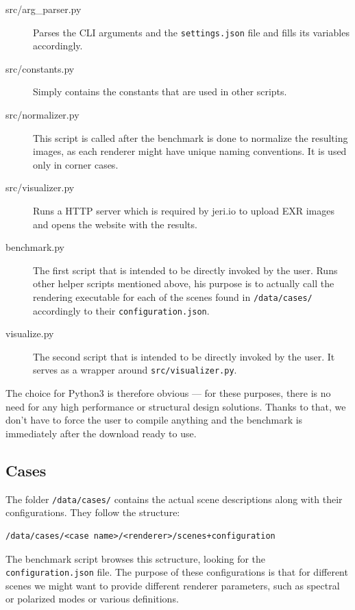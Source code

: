 \begin{description}
	\item[src/arg\_parser.py] Parses the CLI arguments and the \texttt{settings.json} file and fills its variables accordingly.
	\item[src/constants.py] Simply contains the constants that are used in other scripts.
	\item[src/normalizer.py] This script is called after the benchmark is done to normalize the resulting images, as each renderer might have unique naming conventions. It is used only in corner cases.
	\item[src/visualizer.py] Runs a HTTP server which is required by jeri.io to upload EXR images and opens the website with the results.
	\item[benchmark.py] The first script that is intended to be directly invoked by the user. Runs other helper scripts mentioned above, his purpose is to actually call the rendering executable for each of the scenes found in \texttt{/data/cases/} accordingly to their \texttt{configuration.json}.
	\item[visualize.py] The second script that is intended to be directly invoked by the user. It serves as a wrapper around \texttt{src/visualizer.py}.
\end{description}

The choice for Python3 is therefore obvious --- for these purposes, there is no need for any high performance or structural design solutions. Thanks to that, we don't have to force the user to compile anything and the benchmark is immediately after the download ready to use.

\subsection{Cases}

The folder \texttt{/data/cases/} contains the actual scene descriptions along with their configurations. They follow the structure:

\begin{lstlisting}
/data/cases/<case name>/<renderer>/scenes+configuration
\end{lstlisting}

The benchmark script browses this sctructure, looking for the \texttt{configuration.json} file. The purpose of these configurations is that for different scenes we might want to provide different renderer parameters, such as spectral or polarized modes or various definitions.

